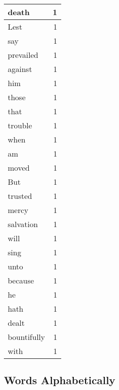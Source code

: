 \begin{center}
\begin{longtable}{l|r}
death & 1 \\ \hline
Lest & 1 \\ \hline
say & 1 \\ \hline
prevailed & 1 \\ \hline
against & 1 \\ \hline
him & 1 \\ \hline
those & 1 \\ \hline
that & 1 \\ \hline
trouble & 1 \\ \hline
when & 1 \\ \hline
am & 1 \\ \hline
moved & 1 \\ \hline
But & 1 \\ \hline
trusted & 1 \\ \hline
mercy & 1 \\ \hline
salvation & 1 \\ \hline
will & 1 \\ \hline
sing & 1 \\ \hline
unto & 1 \\ \hline
because & 1 \\ \hline
he & 1 \\ \hline
hath & 1 \\ \hline
dealt & 1 \\ \hline
bountifully & 1 \\ \hline
with & 1 \\ \hline
\end{longtable}
\end{center}



\normalsize



\subsection{Words Alphabetically}

